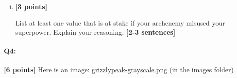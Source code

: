 \documentclass[11pt]{article}
\begin{document}
\begin{enumerate}[(a)]
\begin{enumerate}[(i)]
\begin{tcolorbox}[colback=white!5!white,colframe=green!75!black]
{{        
        }}
    \end{tcolorbox}
    \item \textbf{[3 points]}
    \begin{tcolorbox}[colback=orange!5!white,colframe=orange!75!black]
    
    List at least one value that is at stake if your archenemy misused your superpower. Explain your reasoning. \textbf{[2-3 sentences]}
    \end{tcolorbox}
    
    
    \end{enumerate}

\end{enumerate}



\pagebreak
\paragraph{Q4:} \textbf{[6 points]} Here is an image: \href{run:images/grizzlypeak-grayscale.png}{grizzlypeak-grayscale.png} (in the images folder)
\end{document}
